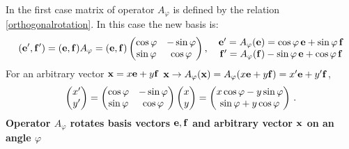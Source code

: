 \documentclass[12pt]{article}
\numberwithin{equation}{section}
\begin{document}
 In the first case matrix of operator $A_\varphi$ is 
defined by the relation \eqref{orthogonalrotation}.
In this case the new basis is:
    \begin{equation}\label{rotationofbasisontheangle}
   ({\bf e}',{\bf f}')=
   ({\bf e},{\bf f})
     A_\varphi=
     ({\bf e},{\bf f})
   \begin{pmatrix}
      \cos\varphi & -\sin\varphi \\
      \sin\varphi & \cos\varphi \\
    \end{pmatrix}
                 ,\quad
            \begin{matrix}
   {\bf e}'=A_\varphi({\bf e})= \cos\varphi \,{\bf e}+\sin\varphi \,{\bf f}\cr
   {\bf f}'=A_\varphi({\bf f}) -\sin\varphi\, {\bf e}+\cos\varphi \,{\bf f}\cr
            \end{matrix}
            \end{equation}
For an arbitrary vector ${\bf x}=x{\bf e}+y{\bf f}$
${\bf x}\to A_\varphi({\bf x})=A_\varphi(x{\bf e}+y{\bf f})=x'{\bf e}+y'{\bf f}$,
             \begin{equation}
        \begin{pmatrix}
           x'\cr y'\cr
        \end{pmatrix} =
          \begin{pmatrix}
      \cos\varphi & -\sin\varphi \\
      \sin\varphi & \cos\varphi \\
             \end{pmatrix}
           \begin{pmatrix}
           x\cr y\cr
        \end{pmatrix}=
           \begin{pmatrix}
           x\cos\varphi-y\sin\varphi\cr 
        \sin\varphi+y\cos\varphi\cr
        \end{pmatrix}\,.
             \end{equation}
{\bf  Operator $A_\varphi$ rotates 
basis vectors ${\bf e},{\bf f}$ and arbitrary vector ${\bf x}$ on an angle
$\varphi$ }


\m
\end{document}
